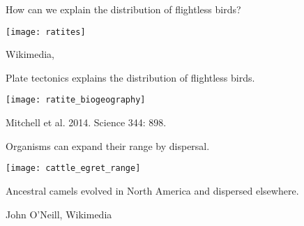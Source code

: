 \documentclass[t]{beamer}
\begin{document}
\begin{frame}[t]{How can we explain the distribution of flightless birds?}

	{\centering \texttt{[image: ratites]}\par
	}

	\vfilll
	
	\hfill \tiny Wikimedia, 

\end{frame}

\begin{frame}[t]{Plate tectonics explains the distribution of flightless birds.}

	{\centering \texttt{[image: ratite\_biogeography]}\par
	}

	\vfilll
	
	\hfill \tiny Mitchell et al. 2014. Science 344: 898.
	
\end{frame}

\begin{frame}[t]{Organisms can expand their range by dispersal.}

	{\centering \texttt{[image: cattle\_egret\_range]}\par
	}
	
\end{frame}
%
{
\begin{frame}[b]{Ancestral camels evolved in North America and dispersed elsewhere.}

	\tiny  John O'Neill, Wikimedia 

\end{frame}
}
%
\end{document}
